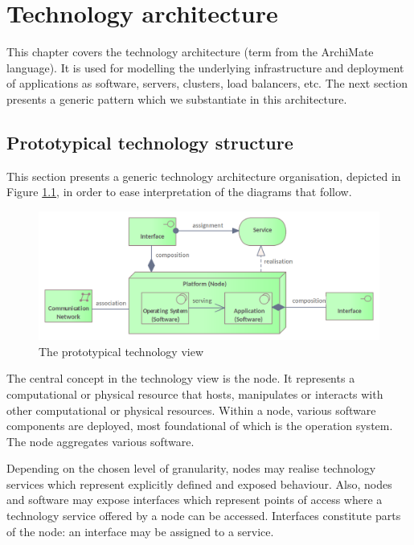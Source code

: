\chapter{Technology architecture}
\label{sec:technology-architecture}

    This chapter covers the technology architecture (term from the ArchiMate language). It is used for modelling the underlying infrastructure and deployment of applications as software, servers, clusters, load balancers, etc. The next section presents a generic pattern which we substantiate in this architecture. 
    
	\section{Prototypical technology structure}
	
	This section presents a generic technology architecture organisation, depicted in Figure \ref{fig:technology-view}, in order to ease interpretation of the diagrams that follow.
	
	\begin{figure}[!h]
		\centering
		\includegraphics[width=.75\textwidth]{images/views/Technology View.png}
		\caption{The prototypical technology view}
		\label{fig:technology-view}
	\end{figure}

	The central concept in the technology view is the node. It represents a computational or physical resource that hosts, manipulates or interacts with other computational or physical resources. Within a node, various software components are deployed, most foundational of which is the operation system. The node aggregates various software. 
	
	Depending on the chosen level of granularity, nodes may realise technology services which represent explicitly defined and exposed behaviour. Also, nodes and software may expose interfaces which represent points of access where a technology service offered by a node can be accessed. Interfaces constitute parts of the node: an interface may be assigned to a service.
	
